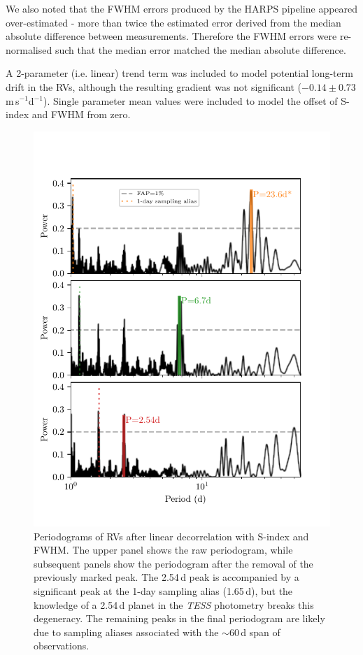 \documentclass[fleqn,usenatbib]{mnras}
\newcommand{\tess}{{\it TESS}}
\newcommand{\harps}{{HARPS}}
\newcommand{\ms}{m\,s$^{-1}$}
\begin{document}
We also noted that the FWHM errors produced by the \harps{} pipeline appeared over-estimated - more than twice the estimated error derived from the median absolute difference between measurements.
Therefore the FWHM errors were re-normalised such that the median error matched the median absolute difference.

A 2-parameter (i.e. linear) trend term was included to model potential long-term drift in the RVs, although the resulting gradient was not significant ($-0.14\pm0.73$\,\ms{}d$^{-1}$).
Single parameter mean values were included to model the offset of S-index and FWHM from zero.


\begin{figure}
	\includegraphics[width=\columnwidth, trim={0.3cm 1.1cm 0.8cm 1.3cm}]{TOI755_decorrelation_periodograms}
    \caption{Periodograms of RVs after linear decorrelation with S-index and FWHM. The upper panel shows the raw periodogram, while subsequent panels show the periodogram after the removal of the previously marked peak. The 2.54\,d peak is accompanied by a significant peak at the 1-day sampling alias (1.65\,d), but the knowledge of a 2.54\,d planet in the \tess{} photometry breaks this degeneracy. The remaining peaks in the final periodogram are likely due to sampling aliases associated with the $\sim60$\,d span of observations.}
    \label{fig:rv_decorr}
\end{figure}
\end{document}
